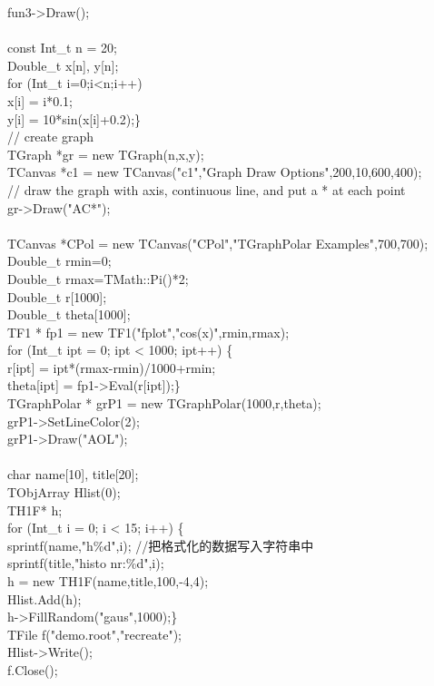 \documentclass[11pt,a4paper,titlepage]{article}
\begin{document}
fun3->Draw();\\
\\
const Int\_t n = 20;\\
Double\_t x[n], y[n];\\
for (Int\_t i=0;i<n;i++)\ {\\
x[i] = i*0.1;\\
y[i] = 10*sin(x[i]+0.2);\}\\
// create graph\\
TGraph *gr = new TGraph(n,x,y);\\
TCanvas *c1 = new TCanvas("c1","Graph Draw Options",200,10,600,400);\\
// draw the graph with axis, continuous line, and put a * at each point\\
gr->Draw("AC*");\\
\\
TCanvas *CPol = new TCanvas("CPol","TGraphPolar Examples",700,700);\\
Double\_t rmin=0;\\
Double\_t rmax=TMath::Pi()*2;\\
Double\_t r[1000];\\
Double\_t theta[1000];\\
TF1 * fp1 = new TF1("fplot","cos(x)",rmin,rmax);\\
for (Int\_t ipt = 0; ipt < 1000; ipt++) \{\\
r[ipt] = ipt*(rmax-rmin)/1000+rmin;\\
theta[ipt] = fp1->Eval(r[ipt]);\}\\
TGraphPolar * grP1 = new TGraphPolar(1000,r,theta);\\
grP1->SetLineColor(2);\\
grP1->Draw("AOL");\\
\\
char name[10], title[20];\\
TObjArray Hlist(0);\\
TH1F* h;\\
for (Int\_t i = 0; i < 15; i++) \{\\
sprintf(name,"h\%d",i);   //把格式化的数据写入字符串中\\
sprintf(title,"histo nr:\%d",i);\\
h = new TH1F(name,title,100,-4,4);\\
Hlist.Add(h);\\
h->FillRandom("gaus",1000);\}\\
TFile f("demo.root","recreate");\\
Hlist->Write();\\
f.Close();\\

}
\end{document}
